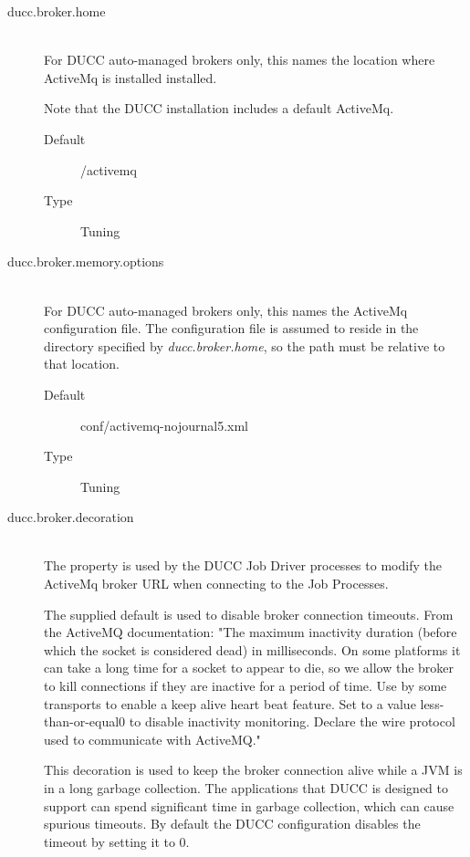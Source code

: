 \begin{description}
       \item[ducc.broker.home] \hfill \\
         For DUCC auto-managed brokers only, this names the location where ActiveMq is installed
         installed.  

         Note that the DUCC installation includes a default ActiveMq.
         \begin{description}
           \item[Default] \duccruntime/activemq 
           \item[Type] Tuning
         \end{description} 
           
       \item[ducc.broker.memory.options] \hfill \\
         For DUCC auto-managed brokers only, this names the ActiveMq configuration file.  The configuration
         file is assumed to reside in the directory specified by {\em ducc.broker.home}, so the path must be relative
         to that location.
         \begin{description}
           \item[Default] conf/activemq-nojournal5.xml
           \item[Type] Tuning
         \end{description} 
           
           
       \item[ducc.broker.decoration] \hfill \\
         The property is used by the DUCC Job Driver processes to modify the ActiveMq broker URL
         when connecting to the Job Processes.

         The supplied default is used to disable broker connection timeouts.  From the ActiveMQ
         documentation: "The maximum inactivity duration (before which the socket is considered
         dead) in milliseconds. On some platforms it can take a long time for a socket to appear to
         die, so we allow the broker to kill connections if they are inactive for a period of
         time. Use by some transports to enable a keep alive heart beat feature. Set to a value
         less-than-or-equal0 to disable inactivity monitoring. Declare the wire protocol used to
         communicate with ActiveMQ."
         
         This decoration is used to keep the broker connection alive while a JVM is in a
         long garbage collection. The applications that DUCC is designed to support can
         spend significant time in garbage collection, which can cause spurious timeouts. By
         default the DUCC configuration disables the timeout by setting it to 0.       


\end{description}
